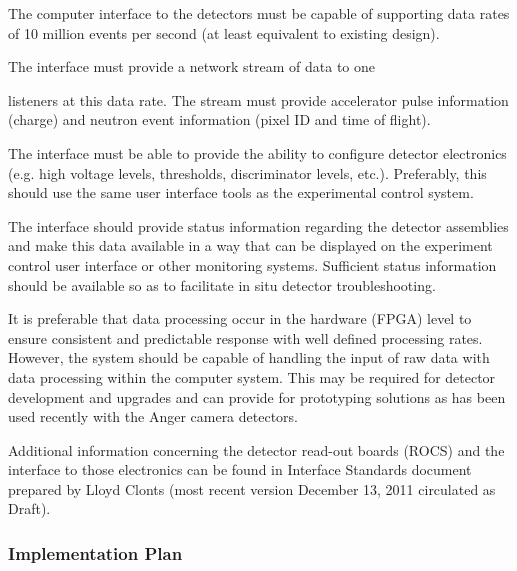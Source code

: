 The computer interface to the detectors must be capable of supporting
data rates of 10 million events per second (at least equivalent to existing
design).

The interface must provide a network stream of data to one 

listeners at this data rate. The stream must provide accelerator
pulse information (charge) and neutron event information (pixel ID
and time of flight).

The interface must be able to provide the ability to configure detector
electronics (e.g. high voltage levels, thresholds, discriminator levels,
etc.). Preferably, this should use the same user interface tools as the
experimental control system.

The interface should provide status information regarding the detector
assemblies and make this data available in a way that can be displayed
on the experiment control user interface or other monitoring systems.
Sufficient status information should be available so as to facilitate
in situ detector troubleshooting.

It is preferable that data processing occur in the hardware (FPGA) level
to ensure consistent and predictable response with well defined processing
rates. However, the system should be capable of handling the input of raw
data with data processing within the computer system. This may be required
for detector development and upgrades and can provide for prototyping
solutions as has been used recently with the Anger camera detectors.


Additional information concerning the detector read-out boards (ROCS) and
the interface to those electronics can be found in Interface Standards
document prepared by Lloyd Clonts (most recent version December 13,
2011 circulated as Draft).


\subsubsection{Implementation Plan}

